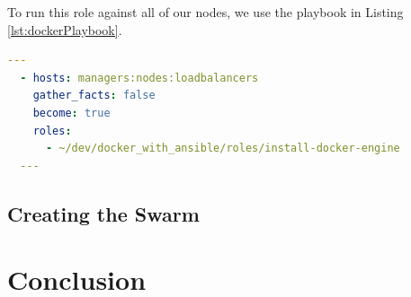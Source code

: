 \documentclass{article}
\begin{document}
To run this role against all of our nodes, we use the playbook in Listing \ref{lst:dockerPlaybook}.

\begin{lstlisting}[float,floatplacement=H,language=yaml,caption={install-docker-engine.yml},label={lst:dockerPlaybook},basicstyle=\small]
  ---
  - hosts: managers:nodes:loadbalancers
    gather_facts: false
    become: true
    roles:
      - ~/dev/docker_with_ansible/roles/install-docker-engine
  ---
\end{lstlisting}

\newpage
\subsection{Creating the Swarm}
\label{subs:creating_swarm}


\newpage
\section{Conclusion}
\label{sec:Conclusion}

\newpage

\end{document}

